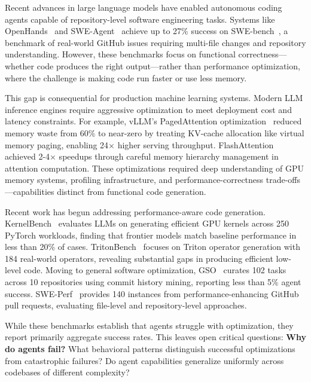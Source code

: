 \documentclass{article}
\theoremstyle{plain}
\theoremstyle{definition}
\theoremstyle{remark}
\begin{document}
Recent advances in large language models have enabled autonomous coding agents capable of repository-level software engineering tasks. Systems like OpenHands~\citep{wang2024openhands} and SWE-Agent~\citep{yang2024sweagent} achieve up to 27\% success on SWE-bench~\citep{jimenez2023swe}, a benchmark of real-world GitHub issues requiring multi-file changes and repository understanding. However, these benchmarks focus on functional correctness---whether code produces the right output---rather than performance optimization, where the challenge is making code run faster or use less memory.

This gap is consequential for production machine learning systems. Modern LLM inference engines require aggressive optimization to meet deployment cost and latency constraints. For example, vLLM's PagedAttention optimization~\citep{kwon2023vllm} reduced memory waste from 60\% to near-zero by treating KV-cache allocation like virtual memory paging, enabling 24$\times$ higher serving throughput. FlashAttention~\citep{dao2022flashattention} achieved 2-4$\times$ speedups through careful memory hierarchy management in attention computation. These optimizations required deep understanding of GPU memory systems, profiling infrastructure, and performance-correctness trade-offs---capabilities distinct from functional code generation.

Recent work has begun addressing performance-aware code generation. KernelBench~\citep{ouyang2025kernelbench} evaluates LLMs on generating efficient GPU kernels across 250 PyTorch workloads, finding that frontier models match baseline performance in less than 20\% of cases. TritonBench~\citep{li2025tritonbench} focuses on Triton operator generation with 184 real-world operators, revealing substantial gaps in producing efficient low-level code. Moving to general software optimization, GSO~\citep{shetty2025gso} curates 102 tasks across 10 repositories using commit history mining, reporting less than 5\% agent success. SWE-Perf~\citep{he2025sweperf} provides 140 instances from performance-enhancing GitHub pull requests, evaluating file-level and repository-level approaches.

While these benchmarks establish that agents struggle with optimization, they report primarily aggregate success rates. This leaves open critical questions: \textbf{Why do agents fail?} What behavioral patterns distinguish successful optimizations from catastrophic failures? Do agent capabilities generalize uniformly across codebases of different complexity?
\end{document}
